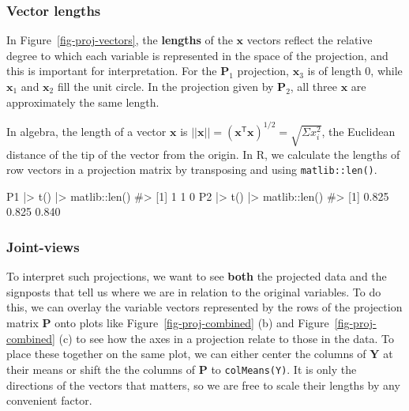 \documentclass[
  letterpaper,
  10pt,
  krantz2]{krantz}
\makeatletter
\newenvironment{Shaded}{\begin{snugshade}}{\end{snugshade}}
\newcommand{\CommentTok}[1]{\textcolor[rgb]{0.37,0.37,0.37}{#1}}
\newcommand{\FunctionTok}[1]{\textcolor[rgb]{0.28,0.35,0.67}{#1}}
\newcommand{\NormalTok}[1]{\textcolor[rgb]{0.00,0.23,0.31}{#1}}
\newcommand{\SpecialCharTok}[1]{\textcolor[rgb]{0.37,0.37,0.37}{#1}}
\newenvironment{kframe}{%
  \medskip{}
  \setlength{\fboxsep}{.8em}
  \def\at@end@of@kframe{}%
  \ifinner\ifhmode%
  \def\at@end@of@kframe{\end{minipage}}%
  \begin{minipage}{\columnwidth}%
  \fi\fi%
  \def\FrameCommand##1{\hskip\@totalleftmargin \hskip-\fboxsep
  \colorbox{shadecolor}{##1}\hskip-\fboxsep
      \hskip-\linewidth \hskip-\@totalleftmargin \hskip\columnwidth}%
  \MakeFramed {\advance\hsize-\width
    \@totalleftmargin\z@ \linewidth\hsize
    \@setminipage}}%
{\par\unskip\endMakeFramed%
  \at@end@of@kframe}
\renewenvironment{Shaded}{\begin{kframe}}{\end{kframe}}
\makeatother
\begin{document}
\subsubsection{Vector lengths}\label{vector-lengths}

In Figure~\ref{fig-proj-vectors}, the \textbf{lengths} of the
\(\mathbf{x}\) vectors reflect the relative degree to which each
variable is represented in the space of the projection, and this is
important for interpretation. For the \(\mathbf{P}_1\) projection,
\(\mathbf{x}_3\) is of length 0, while \(\mathbf{x}_1\) and
\(\mathbf{x}_2\) fill the unit circle. In the projection given by
\(\mathbf{P}_2\), all three \(\mathbf{x}\) are approximately the same
length.

In algebra, the length of a vector \(\mathbf{x}\) is
\(||\mathbf{x}|| = (\mathbf{x}^\mathsf{T} \mathbf{x})^{1/2} = \sqrt{\Sigma x_i^2}\),
the Euclidean distance of the tip of the vector from the origin. In R,
we calculate the lengths of row vectors in a projection matrix by
transposing and using \texttt{matlib::len()}.

\begin{Shaded}
\begin{Highlighting}[]
\NormalTok{P1 }\SpecialCharTok{|\textgreater{}} \FunctionTok{t}\NormalTok{() }\SpecialCharTok{|\textgreater{}}\NormalTok{ matlib}\SpecialCharTok{::}\FunctionTok{len}\NormalTok{()}
\CommentTok{\#\textgreater{} [1] 1 1 0}
\NormalTok{P2 }\SpecialCharTok{|\textgreater{}} \FunctionTok{t}\NormalTok{() }\SpecialCharTok{|\textgreater{}}\NormalTok{ matlib}\SpecialCharTok{::}\FunctionTok{len}\NormalTok{()}
\CommentTok{\#\textgreater{} [1] 0.825 0.825 0.840}
\end{Highlighting}
\end{Shaded}

\subsubsection{Joint-views}\label{joint-views}

To interpret such projections, we want to see \textbf{both} the
projected data and the signposts that tell us where we are in relation
to the original variables. To do this, we can overlay the variable
vectors represented by the rows of the projection matrix \(\mathbf{P}\)
onto plots like Figure~\ref{fig-proj-combined} (b) and
Figure~\ref{fig-proj-combined} (c) to see how the axes in a projection
relate to those in the data. To place these together on the same plot,
we can either center the columns of \(\mathbf{Y}\) at their means or
shift the the columns of \(\mathbf{P}\) to \texttt{colMeans(Y)}. It is
only the directions of the vectors that matters, so we are free to scale
their lengths by any convenient factor.
\end{document}
